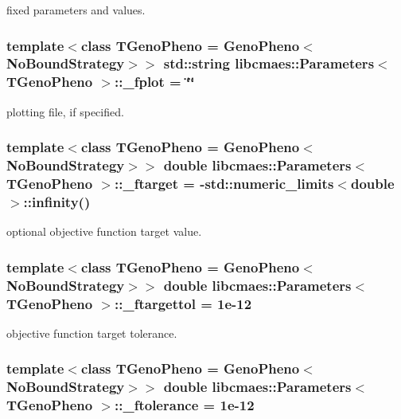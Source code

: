 fixed parameters and values. \hypertarget{classlibcmaes_1_1Parameters_aa49511ea00199348ea94f1aa53fe5bc1}{
\subsubsection[{\-\_\-fplot}]{\setlength{\rightskip}{0pt plus 5cm}template$<$class T\-Geno\-Pheno = Geno\-Pheno$<$\-No\-Bound\-Strategy$>$$>$ std\-::string {\bf libcmaes\-::\-Parameters}$<$ T\-Geno\-Pheno $>$\-::\-\_\-fplot = \char`\"{}\char`\"{}}}\label{classlibcmaes_1_1Parameters_aa49511ea00199348ea94f1aa53fe5bc1}
plotting file, if specified. \hypertarget{classlibcmaes_1_1Parameters_a837dbcfba351a043441076a11666f92c}{
\subsubsection[{\-\_\-ftarget}]{\setlength{\rightskip}{0pt plus 5cm}template$<$class T\-Geno\-Pheno = Geno\-Pheno$<$\-No\-Bound\-Strategy$>$$>$ double {\bf libcmaes\-::\-Parameters}$<$ T\-Geno\-Pheno $>$\-::\-\_\-ftarget = -\/std\-::numeric\-\_\-limits$<$double$>$\-::infinity()}}\label{classlibcmaes_1_1Parameters_a837dbcfba351a043441076a11666f92c}
optional objective function target value. \hypertarget{classlibcmaes_1_1Parameters_af9dde10c81d743c7f684d486f989d1a4}{
\subsubsection[{\-\_\-ftargettol}]{\setlength{\rightskip}{0pt plus 5cm}template$<$class T\-Geno\-Pheno = Geno\-Pheno$<$\-No\-Bound\-Strategy$>$$>$ double {\bf libcmaes\-::\-Parameters}$<$ T\-Geno\-Pheno $>$\-::\-\_\-ftargettol = 1e-\/12}}\label{classlibcmaes_1_1Parameters_af9dde10c81d743c7f684d486f989d1a4}
objective function target tolerance. \hypertarget{classlibcmaes_1_1Parameters_ab6c11cc112b5709e9039967e881c808e}{
\subsubsection[{\-\_\-ftolerance}]{\setlength{\rightskip}{0pt plus 5cm}template$<$class T\-Geno\-Pheno = Geno\-Pheno$<$\-No\-Bound\-Strategy$>$$>$ double {\bf libcmaes\-::\-Parameters}$<$ T\-Geno\-Pheno $>$\-::\-\_\-ftolerance = 1e-\/12}}\label{classlibcmaes_1_1Parameters_ab6c11cc112b5709e9039967e881c808e}
